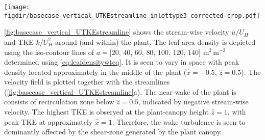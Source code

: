 
\begin{sidewaysfigure}[p]
	\centering
	\texttt{[image: \\figdir/basecase\_vertical\_UTKEstreamline\_inlettype3\_corrected-crop.pdf]}
	\caption{Vertical plane at the center-line (i.e., at $\hat{y}=0$) from numerical simulation:  normalized  streamwise velocity $\overline{u}/U_H$ and  normalized  turbulent kinetic energy $k/U_H^2$ around the plant. The heterogeneous leaf area density $a$ is indicated with red iso-contour lines of $a = [20$, $40$, $60$, $80$, $100$, $120$, $140]$ m$^2$\,m$^{-3}$ and the drag coefficient is $c_d=0.5$.}
	\label{fig:basecase_vertical_UTKEstreamline}
\end{sidewaysfigure}

\cref{fig:basecase_vertical_UTKEstreamline} shows the stream-wise velocity $\overline{u}/U_H$ and TKE $k/U_H^2$ around (and within) the plant. The leaf area density is depicted using the iso-contour lines of $a = [20$, $40$, $60$, $80$, $100$, $120$, $140]$ m$^2$\,m$^{-3}$ determined using \cref{eq:leafdensitywteq}. It is seen to vary in space with peak density located approximately in the middle of the plant ($\hat{x}=-0.5$, $\hat{z}=0.5$). The velocity field is plotted together with the streamlines (\cref{fig:basecase_vertical_UTKEstreamline}a). The near-wake of the plant is consists of recirculation zone below $\hat{z} = 0.5$, indicated by negative stream-wise velocity. The highest TKE is observed at the plant-canopy height $\hat{z} = 1$, with peak TKE at approximately $\hat{x} = 1$. Therefore, the wake turbulence is seen to dominantly affected by the shear-zone generated by the plant canopy.


